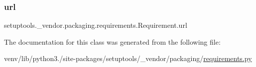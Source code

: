 \subsubsection{\texorpdfstring{url}{url}}
{\footnotesize\ttfamily setuptools.\+\_\+vendor.\+packaging.\+requirements.\+Requirement.\+url}



The documentation for this class was generated from the following file\+:\begin{DoxyCompactItemize}
\item 
venv/lib/python3./site-\/packages/setuptools/\+\_\+vendor/packaging/\hyperlink{setuptools_2__vendor_2packaging_2requirements_8py}{requirements.\+py}\end{DoxyCompactItemize}
